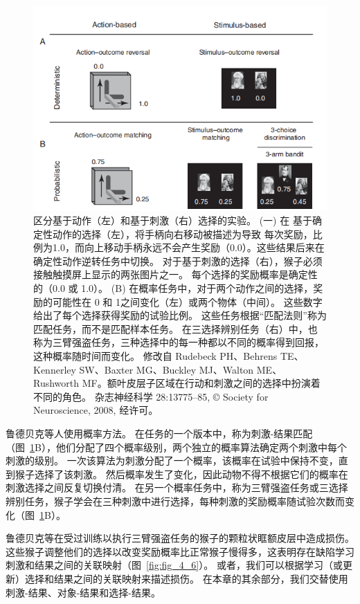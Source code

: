 \begin{figure}[!htb]
	\centering
	\includegraphics{image_pfc/Fig_4_5}
	\caption{区分基于动作（左）和基于刺激（右）选择的实验。 (一) 在
		基于确定性动作的选择（左），将手柄向右移动被描述为导致
		每次奖励，比例为1.0，而向上移动手柄永远不会产生奖励（0.0）。这些结果后来在确定性动作逆转任务中切换。
		对于基于刺激的选择（右），猴子必须接触触摸屏上显示的两张图片之一。
		每个选择的奖励概率是确定性的（0.0 或 1.0）。 
		(B) 在概率任务中，对于两个动作之间的选择，奖励的可能性在 0 和 1之间变化（左）或两个物体（中间）。
		这些数字给出了每个选择获得奖励的试验比例。
		这些任务根据“匹配法则”称为匹配任务，而不是匹配样本任务。
		在三选择辨别任务（右）中，也称为三臂强盗任务，三种选择中的每一种都以不同的概率得到回报，这种概率随时间而变化。
		修改自	Rudebeck PH、Behrens TE、Kennerley SW、Baxter MG、Buckley MJ、Walton ME、Rushworth MF。额叶皮层子区域在行动和刺激之间的选择中扮演着不同的角色。
		杂志神经科学 28:13775–85, © Society for Neuroscience, 2008, 经许可。}
	\label{fig:fig_4_5}
\end{figure}


鲁德贝克等人\cite{rudebeck2008frontal}使用概率方法。
在任务的一个版本中，称为刺激-结果匹配（图~\ref{fig:fig_4_5}B），他们分配了四个概率级别，两个独立的概率算法确定两个刺激中每个刺激的级别。
一次该算法为刺激分配了一个概率，该概率在试验中保持不变，直到猴子选择了该刺激。
然后概率发生了变化，因此动物不得不根据它们的概率在刺激选择之间反复切换付清。
在另一个概率任务中，称为三臂强盗任务或三选择辨别任务，猴子学会在三种刺激中进行选择，每种刺激的奖励概率随试验次数而变化（图~\ref{fig:fig_4_5}B）。\par


鲁德贝克等在受过训练以执行三臂强盗任务的猴子的颗粒状眶额皮层中造成损伤。
这些猴子调整他们的选择以改变奖励概率比正常猴子慢得多，这表明存在缺陷学习刺激和结果之间的关联映射（图~\ref{fig:fig_4_6}）。
或者，我们可以根据学习（或更新）选择和结果之间的关联映射来描述损伤。
在本章的其余部分，我们交替使用刺激-结果、对象-结果和选择-结果。\par


